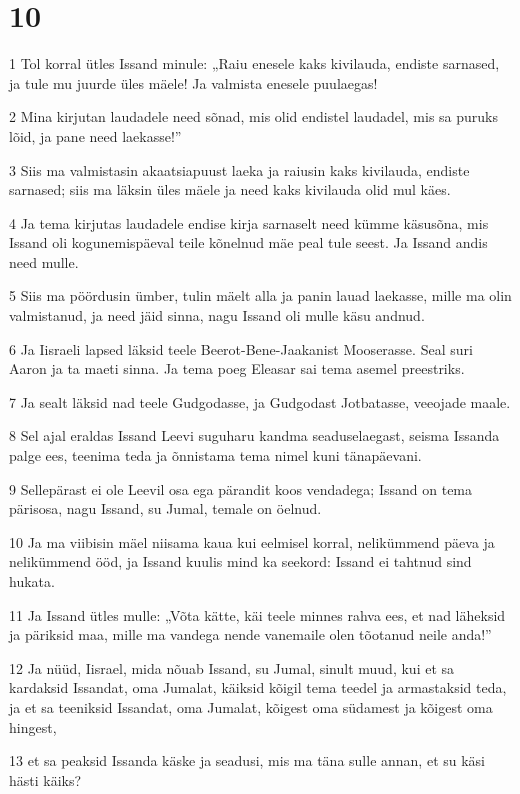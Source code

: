 \chapter{10}

\par 1 Tol korral ütles Issand minule: „Raiu enesele kaks kivilauda, endiste sarnased, ja tule mu juurde üles mäele! Ja valmista enesele puulaegas!
\par 2 Mina kirjutan laudadele need sõnad, mis olid endistel laudadel, mis sa puruks lõid, ja pane need laekasse!”
\par 3 Siis ma valmistasin akaatsiapuust laeka ja raiusin kaks kivilauda, endiste sarnased; siis ma läksin üles mäele ja need kaks kivilauda olid mul käes.
\par 4 Ja tema kirjutas laudadele endise kirja sarnaselt need kümme käsusõna, mis Issand oli kogunemispäeval teile kõnelnud mäe peal tule seest. Ja Issand andis need mulle.
\par 5 Siis ma pöördusin ümber, tulin mäelt alla ja panin lauad laekasse, mille ma olin valmistanud, ja need jäid sinna, nagu Issand oli mulle käsu andnud.
\par 6 Ja Iisraeli lapsed läksid teele Beerot-Bene-Jaakanist Mooserasse. Seal suri Aaron ja ta maeti sinna. Ja tema poeg Eleasar sai tema asemel preestriks.
\par 7 Ja sealt läksid nad teele Gudgodasse, ja Gudgodast Jotbatasse, veeojade maale.
\par 8 Sel ajal eraldas Issand Leevi suguharu kandma seaduselaegast, seisma Issanda palge ees, teenima teda ja õnnistama tema nimel kuni tänapäevani.
\par 9 Sellepärast ei ole Leevil osa ega pärandit koos vendadega; Issand on tema pärisosa, nagu Issand, su Jumal, temale on öelnud.
\par 10 Ja ma viibisin mäel niisama kaua kui eelmisel korral, nelikümmend päeva ja nelikümmend ööd, ja Issand kuulis mind ka seekord: Issand ei tahtnud sind hukata.
\par 11 Ja Issand ütles mulle: „Võta kätte, käi teele minnes rahva ees, et nad läheksid ja päriksid maa, mille ma vandega nende vanemaile olen tõotanud neile anda!”
\par 12 Ja nüüd, Iisrael, mida nõuab Issand, su Jumal, sinult muud, kui et sa kardaksid Issandat, oma Jumalat, käiksid kõigil tema teedel ja armastaksid teda, ja et sa teeniksid Issandat, oma Jumalat, kõigest oma südamest ja kõigest oma hingest,
\par 13 et sa peaksid Issanda käske ja seadusi, mis ma täna sulle annan, et su käsi hästi käiks?
